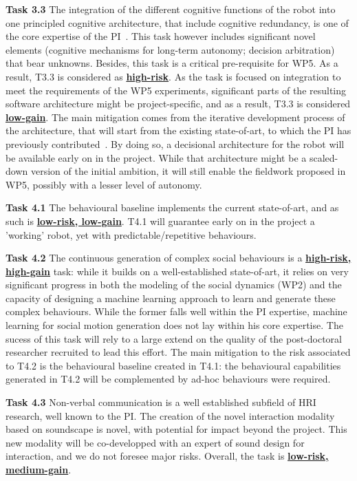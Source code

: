 \documentclass[11pt,a4paper]{report}
\begin{document}
\textbf{Task 3.3} The integration of the different cognitive functions of the
robot into one principled cognitive architecture, that include cognitive
redundancy, is one of the core expertise of the
PI~\cite{lemaignan2017artificial}. This task however includes significant novel
elements (cognitive mechanisms for long-term autonomy; decision arbitration)
that bear unknowns. Besides, this task is a critical pre-requisite for WP5. As a
result, T3.3 is considered as \ul{\bf high-risk}. As the task is focused on
integration to meet the requirements of the WP5 experiments, significant parts
of the resulting software architecture might be project-specific, and as a
result, T3.3 is considered \ul{\bf low-gain}. The main mitigation comes from the
iterative development process of the architecture, that will start from the existing
state-of-art, to which the PI has previously
contributed~\cite{lemaignan2017artificial}. By doing so, a decisional
architecture for the robot will be available early on in the project. While that
architecture might be a scaled-down version of the initial ambition, it will
still enable the fieldwork proposed in WP5, possibly with a lesser level of
autonomy.

\vspace{1em}

\textbf{Task 4.1} The behavioural baseline implements the current state-of-art,
and as such is \ul{\bf low-risk, low-gain}. T4.1 will guarantee early on in the
project a 'working' robot, yet with predictable/repetitive behaviours.

\textbf{Task 4.2} The continuous generation of complex social behaviours is a
\ul{\bf high-risk, high-gain} task: while it builds on a well-established
state-of-art, it relies on very significant progress in both the modeling of the
social dynamics (WP2) and the capacity of designing a machine learning approach
to learn and generate these complex behaviours. While the former falls well
within the PI expertise, machine learning for social motion generation does not
lay within his core expertise. The sucess of this task will rely to a large
extend on the quality of the post-doctoral researcher recruited to lead this
effort. The main mitigation to the risk associated to T4.2 is the behavioural
baseline created in T4.1: the behavioural capabilities generated in T4.2 will be
complemented by ad-hoc behaviours were required.

\textbf{Task 4.3} Non-verbal communication is a well established subfield of HRI
research, well known to the PI. The creation of the novel interaction modality
based on soundscape is novel, with potential for impact beyond the project. This
new modality will be co-developped with an expert of sound design for
interaction, and we do not foresee major risks. Overall, the task is \ul{\bf
low-risk, medium-gain}.
\end{document}
